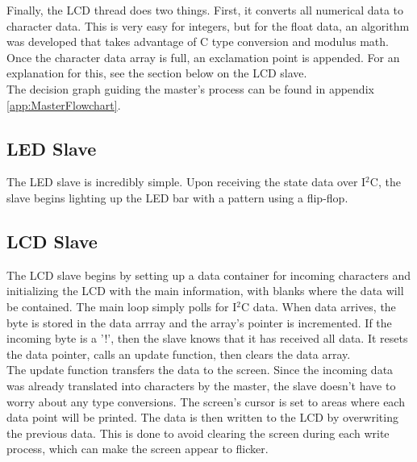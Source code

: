 \documentclass{article}
\begin{document}
\noindent Finally, the LCD thread does two things. First, it converts all numerical data to character data. This is very easy for integers, but for the float data, an algorithm was developed that takes advantage of C type conversion and modulus math. Once the character data array is full, an exclamation point is appended. For an explanation for this, see the section below on the LCD slave.\\

\noindent The decision graph guiding the master's process can be found in appendix \ref{app:MasterFlowchart}.\\




\subsection{LED Slave}
\label{sec:LEDSlave}


The LED slave is incredibly simple. Upon receiving the state data over I\(^2\)C, the slave begins lighting up the LED bar with a pattern using a flip-flop.\\


\subsection{LCD Slave}
\label{sec:LCDSlave}

The LCD slave begins by setting up a data container for incoming characters and initializing the LCD with the main information, with blanks where the data will be contained. The main loop simply polls for I\(^2\)C data. When data arrives, the byte is stored in the data arrray and the array's pointer is incremented. If the incoming byte is a '!', then the slave knows that it has received all data. It resets the data pointer, calls an update function, then clears the data array.\\

\noindent The update function transfers the data to the screen. Since the incoming data was already translated into characters by the master, the slave doesn't have to worry about any type conversions. The screen's cursor is set to areas where each data point will be printed. The data is then written to the LCD by overwriting the previous data. This is done to avoid clearing the screen during each write process, which can make the screen appear to flicker.\\
\end{document}
